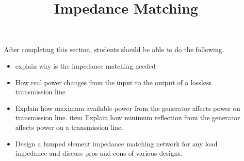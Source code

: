 \documentclass{ximera}
\title{Impedance Matching}
\begin{document}
\begin{abstract}
\end{abstract}

\maketitle

\begin{sectionOutcomes}

After completing this section, students should be able to do the following.

\begin{itemize}
\item explain why is the impedance matching needed
\item How real power changes from the input to the output of a lossless transmission line
\item Explain how maximum available power from the generator affects power on transmission line.
item Explain how minimum reflection from the generator affects power on a transmission line.
\item Design a lumped element impedance matching network for any load impedance and discuss pros and cons of various designs.
\end{itemize}

\end{sectionOutcomes}
\end{document}
